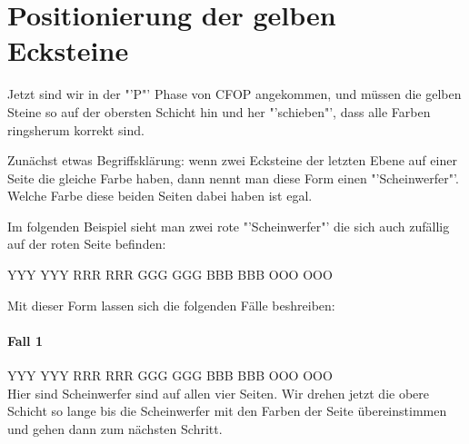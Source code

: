\section{Positionierung der gelben Ecksteine}
Jetzt sind wir in der "'P"' Phase von CFOP angekommen, und müssen die gelben Steine so auf der obersten Schicht hin und her "'schieben"', dass alle Farben ringsherum korrekt sind.

Zunächst etwas Begriffsklärung: wenn zwei Ecksteine der letzten Ebene auf einer Seite die gleiche Farbe haben, dann nennt man diese Form einen "'Scheinwerfer"'.
Welche Farbe diese beiden Seiten dabei haben ist egal.

Im folgenden Beispiel sieht man zwei rote "'Scheinwerfer"' die sich auch zufällig auf der roten Seite befinden:
\begin{center}
  \RubikCubeGreyAll%
	      {Y}{Y}{Y}
	      {Y}{Y}{Y}%
		 {R}{R}{R}
		 {R}{R}{R}%
		 {G}{G}{G}
		 {G}{G}{G}%
		{B}{B}{B}
		{B}{B}{B}%
		{O}{O}{O}
		{O}{O}{O}%
\end{center}

Mit dieser Form lassen sich die folgenden Fälle beshreiben:

\paragraph{Fall 1}
\RubikCubeGreyAll%
            {Y}{Y}{Y}
            {Y}{Y}{Y}%
               {R}{R}{R}
	       {R}{R}{R}%
	       {G}{G}{G}
	       {G}{G}{G}%
	      {B}{B}{B}
	      {B}{B}{B}%
	      {O}{O}{O}
	      {O}{O}{O}%
\\[1em]
Hier sind Scheinwerfer sind auf allen vier Seiten.
Wir drehen jetzt die obere Schicht so lange bis die Scheinwerfer mit den Farben der Seite übereinstimmen und gehen dann zum nächsten Schritt.

